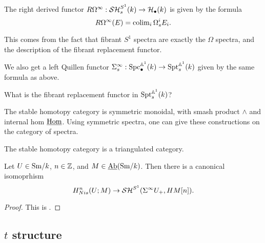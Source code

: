 \documentclass{amsart}%
\begin{document}
\begin{remark}
  The right derived functor
  $R\Omega^{\infty} : \mathcal{SH}^{S^1}_s(k) \to \mathcal{H}_{\bullet}(k)$ is given by
  the formula
  \begin{equation*}
    R\Omega^{\infty}(E) = \operatorname{colim}_i \Omega_s^{i}E_i.
  \end{equation*}

  This comes from the fact that fibrant $S^1$ spectra are exactly the
  $\Omega$ spectra, and the description of the fibrant replacement
  functor. 
\end{remark}

\begin{remark}
  We also get a left Quillen functor
  $ \Sigma^{\infty}_s : \mathrm{Spc}_{\bullet}^{\mathbb{A}^1}(k) \to
  \mathrm{Spt}_s^{\mathbb{A}^1}(k)$ given by the same formula as above.

  What is the fibrant replacement functor in $\mathrm{Spt}_s^{\mathbb{A}^1}(k)$?
\end{remark}

\begin{remark}
  The stable homotopy category is symmetric monoidal, with smash
  product $\wedge$ and internal hom $\underline{\operatorname{Hom}}$. Using
  symmetric spectra, one can give these constructions on the category
  of spectra.

  The stable homotopy category is a triangulated category.  
\end{remark}

\begin{proposition}
  Let $U \in \mathrm{Sm}/k$, $n\in \mathbb{Z}$, and $M \in \operatorname{\underline{Ab}}(\mathrm{Sm}/k)$. Then there
  is a canonical isomoprhism
  \begin{equation*}
    H^n_{Nis}(U; M) \to \mathcal{SH}^{S^1}(\Sigma^{\infty}U_+, HM[n]).
  \end{equation*}
\end{proposition}

\begin{proof}
  This is \cite[Lemma 3.2.3]{Mor05}.
\end{proof}

\subsection{$t$ structure}
\end{document}
